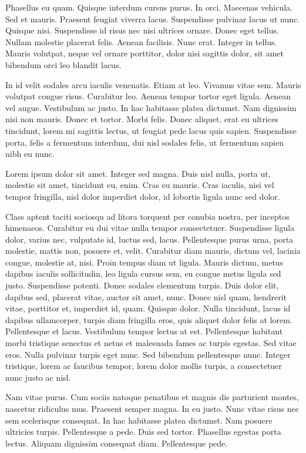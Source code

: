 \documentclass[../hdr.tex]{subfiles}
\begin{document}
Phasellus eu quam. Quisque interdum cursus purus. In orci. Maecenas vehicula.
Sed et mauris. Praesent feugiat viverra lacus. Suspendisse pulvinar lacus ut
nunc. Quisque nisi. Suspendisse id risus nec nisi ultrices ornare. Donec eget
tellus. Nullam molestie placerat felis. Aenean facilisis. Nunc erat. Integer in
tellus. Mauris volutpat, neque vel ornare porttitor, dolor nisi sagittis dolor,
sit amet bibendum orci leo blandit lacus.

In id velit sodales arcu iaculis venenatis. Etiam at leo. Vivamus vitae sem.
Mauris volutpat congue risus. Curabitur leo. Aenean tempor tortor eget ligula.
Aenean vel augue. Vestibulum ac justo. In hac habitasse platea dictumst. Nam
dignissim nisi non mauris. Donec et tortor. Morbi felis. Donec aliquet, erat eu
ultrices tincidunt, lorem mi sagittis lectus, ut feugiat pede lacus quis sapien.
Suspendisse porta, felis a fermentum interdum, dui nisl sodales felis, ut
fermentum sapien nibh eu nunc.

Lorem ipsum dolor sit amet. Integer sed magna. Duis nisl nulla, porta ut,
molestie sit amet, tincidunt eu, enim. Cras eu mauris. Cras iaculis, nisi vel
tempor fringilla, nisl dolor imperdiet dolor, id lobortis ligula nunc sed dolor.

Class aptent taciti sociosqu ad litora torquent per conubia nostra, per inceptos
himenaeos. Curabitur eu dui vitae nulla tempor consectetuer. Suspendisse ligula
dolor, varius nec, vulputate id, luctus sed, lacus. Pellentesque purus urna,
porta molestie, mattis non, posuere et, velit. Curabitur diam mauris, dictum
vel, lacinia congue, molestie at, nisi. Proin tempus diam ut ligula. Mauris
dictum, metus dapibus iaculis sollicitudin, leo ligula cursus sem, eu congue
metus ligula sed justo. Suspendisse potenti. Donec sodales elementum turpis.
Duis dolor elit, dapibus sed, placerat vitae, auctor sit amet, nunc. Donec nisl
quam, hendrerit vitae, porttitor et, imperdiet id, quam. Quisque dolor. Nulla
tincidunt, lacus id dapibus ullamcorper, turpis diam fringilla eros, quis
aliquet dolor felis at lorem. Pellentesque et lacus. Vestibulum tempor lectus at
est. Pellentesque habitant morbi tristique senectus et netus et malesuada fames
ac turpis egestas. Sed vitae eros. Nulla pulvinar turpis eget nunc. Sed bibendum
pellentesque nunc. Integer tristique, lorem ac faucibus tempor, lorem dolor
mollis turpis, a consectetuer nunc justo ac nisl.

Nam vitae purus. Cum sociis natoque penatibus et magnis dis parturient montes,
nascetur ridiculus mus. Praesent semper magna. In eu justo. Nunc vitae risus nec
sem scelerisque consequat. In hac habitasse platea dictumst. Nam posuere
ultricies turpis. Pellentesque a pede. Duis sed tortor. Phasellus egestas porta
lectus. Aliquam dignissim consequat diam. Pellentesque pede.
\end{document}
